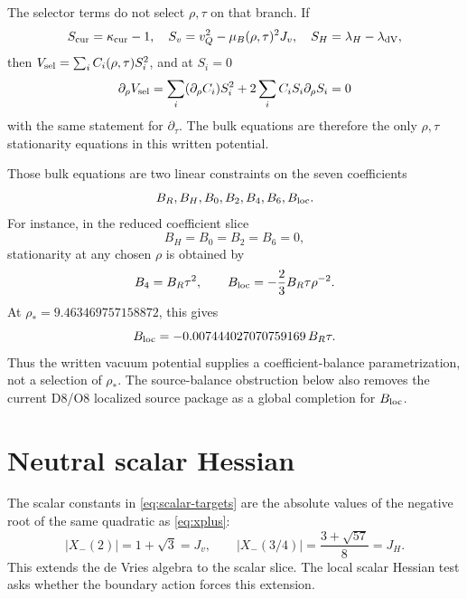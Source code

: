 \documentclass[11pt]{article}
\theoremstyle{plain}
\theoremstyle{definition}
\begin{document}
The selector terms do not select \(\rho,\tau\) on that branch.  If
\[
  S_{\rm cur}=\kappa_{\rm cur}-1,\quad
  S_v=v_Q^2-\mu_B(\rho,\tau)^2J_v,\quad
  S_H=\lambda_H-\lambda_{\rm dV},
\]
then \(V_{\rm sel}=\sum_i C_i(\rho,\tau)S_i^2\), and at \(S_i=0\)
\[
  \partial_\rho V_{\rm sel}
  =
  \sum_i(\partial_\rho C_i)S_i^2
  +2\sum_iC_iS_i\partial_\rho S_i
  =0
\]
with the same statement for \(\partial_\tau\).  The bulk equations are
therefore the only \(\rho,\tau\) stationarity equations in this written
potential.

Those bulk equations are two linear constraints on the seven coefficients
\[
  B_R,B_H,B_0,B_2,B_4,B_6,B_{\rm loc}.
\]
For instance, in the reduced coefficient slice
\[
  B_H=B_0=B_2=B_6=0,
\]
stationarity at any chosen \(\rho\) is obtained by
\[
  B_4=B_R\tau^2,
  \qquad
  B_{\rm loc}=-\frac{2}{3}B_R\tau\rho^{-2}.
\]
At \(\rho_*=9.463469757158872\), this gives
\[
  B_{\rm loc}=-0.007444027070759169\,B_R\tau .
\]
Thus the written vacuum potential supplies a coefficient-balance
parametrization, not a selection of \(\rho_*\).  The source-balance obstruction
below also removes the current D8/O8 localized source package as a global
completion for \(B_{\rm loc}\).

\section{Neutral scalar Hessian}

The scalar constants in \eqref{eq:scalar-targets} are the absolute values of
the negative root of the same quadratic as \eqref{eq:xplus}:
\begin{equation}
  |X_-(2)|=1+\sqrt3=J_v,
  \qquad
  |X_-(3/4)|=\frac{3+\sqrt{57}}{8}=J_H .
  \label{eq:xminus-scalar}
\end{equation}
This extends the de Vries algebra to the scalar slice.  The local scalar
Hessian test asks whether the boundary action forces this extension.
\end{document}
